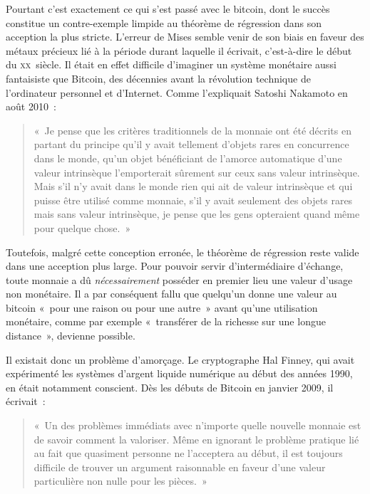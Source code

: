 Pourtant c'est exactement ce qui s'est passé avec le bitcoin, dont le succès constitue un contre-exemple limpide au théorème de régression dans son acception la plus stricte. L'erreur de Mises semble venir de son biais en faveur des métaux précieux lié à la période durant laquelle il écrivait, c'est-à-dire le début du \textsc{xx}\ieme{}~siècle. Il était en effet difficile d'imaginer un système monétaire aussi fantaisiste que Bitcoin, des décennies avant la révolution technique de l'ordinateur personnel et d'Internet. Comme l'expliquait Satoshi Nakamoto en août 2010~:

\begin{quote}
«~Je pense que les critères traditionnels de la monnaie ont été décrits en partant du principe qu'il y avait tellement d'objets rares en concurrence dans le monde, qu'un objet bénéficiant de l'amorce automatique d'une valeur intrinsèque l'emporterait sûrement sur ceux sans valeur intrinsèque. Mais s'il n'y avait dans le monde rien qui ait de valeur intrinsèque et qui puisse être utilisé comme monnaie, s'il y avait seulement des objets rares mais sans valeur intrinsèque, je pense que les gens opteraient quand même pour quelque chose.~»
\end{quote} 

Toutefois, malgré cette conception erronée, le théorème de régression reste valide dans une acception plus large. Pour pouvoir servir d'intermédiaire d'échange, toute monnaie a dû \emph{nécessairement} posséder en premier lieu une valeur d'usage non monétaire. Il a par conséquent fallu que quelqu'un donne une valeur au bitcoin «~pour une raison ou pour une autre~» avant qu'une utilisation monétaire, comme par exemple «~transférer de la richesse sur une longue distance~», devienne possible.

Il existait donc un problème d'amorçage. Le cryptographe Hal Finney, qui avait expérimenté les systèmes d'argent liquide numérique au début des années 1990, en était notamment conscient. Dès les débuts de Bitcoin en janvier 2009, il écrivait~: 

\begin{quote}
«~Un des problèmes immédiats avec n'importe quelle nouvelle monnaie est de savoir comment la valoriser. Même en ignorant le problème pratique lié au fait que quasiment personne ne l'acceptera au début, il est toujours difficile de trouver un argument raisonnable en faveur d'une valeur particulière non nulle pour les pièces.~»
\end{quote}

